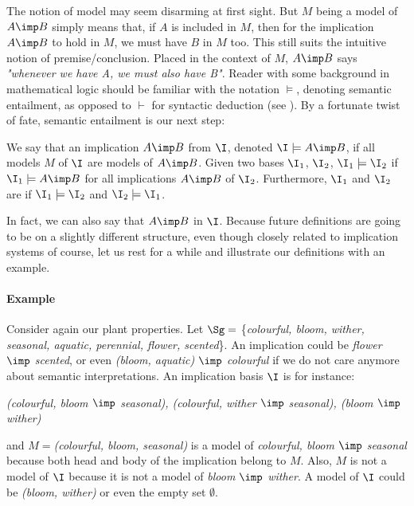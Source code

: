 \noindent The notion of model may seem disarming at first sight. But $M$ being
a model of $A \imp B$ simply means that, if $A$ is included in $M$, then for
the implication $A \imp B$ to hold in $M$, we must have $B$ in $M$ too. This 
still suits the intuitive notion of premise/conclusion. Placed in the context
of $M$, $A \imp B$ says \textit{"whenever we have A, we must also have B"}.
Reader with some background in mathematical logic should be familiar with the
notation $\models$, denoting semantic entailment, as opposed to $\vdash$ for
syntactic deduction (see \cite{cori_mathematical_2000}). By a fortunate twist of
fate, semantic entailment is our next step:

\begin{definition} We say that an implication 
$A \imp B$  from $\I$, denoted $\I \models A 
\imp B$, if all models $M$ of $\I$ are models of $A \imp B$. Given two bases $\I_1$, $\I_2$, $\I_1 \models \I_2$ if $\I_1 \models A \imp B$ for all
implications $A \imp B$ of $\I_2$. Furthermore, $\I_1$ and $\I_2$ are  if $\I_1 \models \I_2$ and $\I_2 \models \I_1$.  
	
\end{definition} 

\noindent In fact, we can also say that $A \imp B$  in $\I$. Because future definitions are going to be on a slightly different 
structure, even though closely related to implication systems of course, let us
rest for a while and illustrate our definitions with an example.


\paragraph{Example} Consider again our plant properties. Let $\Sg = $ 
\{\textit{colourful, bloom, wither, seasonal, aquatic, perennial, flower, 
	scented}\}. An implication could be \textit{flower $\imp$ scented}, or even
\textit{(bloom, aquatic) $\imp$ colourful} if we do not care anymore about semantic interpretations. An implication basis $\I$ is for instance:

\begin{center}
	\textit{(colourful, bloom $\imp$ seasonal), (colourful, wither $\imp$ 
		seasonal), (bloom $\imp$ wither)}
\end{center}

\noindent and $M = $\textit{(colourful, bloom, seasonal)} is a model of 
\textit{colourful, bloom $\imp$ seasonal} because both head and body
of the implication belong to $M$. Also, $M$ is not a model of $\I$ because it
is not a model of \textit{bloom $\imp$ wither}. A model of $\I$ could be 
\textit{(bloom, wither)} or even the empty set $\emptyset$.

